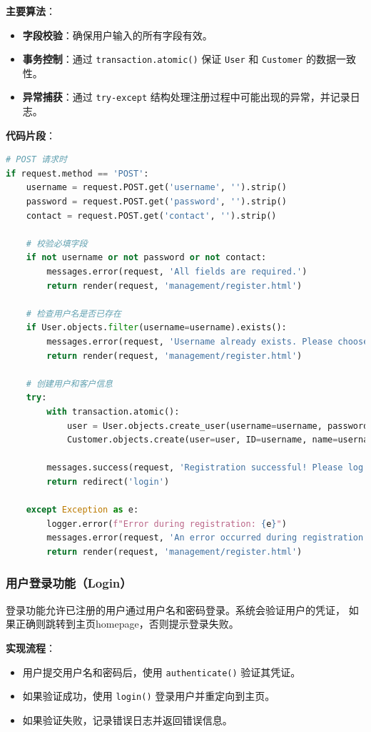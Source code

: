\documentclass[UTF8,a4paper,12pt]{ctexart}
\begin{document}
\textbf{主要算法}：
\begin{itemize}
    \item \textbf{字段校验}：确保用户输入的所有字段有效。
    \item \textbf{事务控制}：通过 \texttt{transaction.atomic()} 保证 \texttt{User} 和 \texttt{Customer} 的数据一致性。
    \item \textbf{异常捕获}：通过 \texttt{try-except} 结构处理注册过程中可能出现的异常，并记录日志。
\end{itemize}

\textbf{代码片段}：
\begin{lstlisting}[language=Python]
# POST 请求时
if request.method == 'POST':
    username = request.POST.get('username', '').strip()
    password = request.POST.get('password', '').strip()
    contact = request.POST.get('contact', '').strip()

    # 校验必填字段
    if not username or not password or not contact:
        messages.error(request, 'All fields are required.')
        return render(request, 'management/register.html')

    # 检查用户名是否已存在
    if User.objects.filter(username=username).exists():
        messages.error(request, 'Username already exists. Please choose another one.')
        return render(request, 'management/register.html')

    # 创建用户和客户信息
    try:
        with transaction.atomic():
            user = User.objects.create_user(username=username, password=password)
            Customer.objects.create(user=user, ID=username, name=username, contact=contact)

        messages.success(request, 'Registration successful! Please log in.')
        return redirect('login')

    except Exception as e:
        logger.error(f"Error during registration: {e}")
        messages.error(request, 'An error occurred during registration. Please try again.')
        return render(request, 'management/register.html')
\end{lstlisting}

\subsubsection{用户登录功能（Login）}
登录功能允许已注册的用户通过用户名和密码登录。系统会验证用户的凭证，
如果正确则跳转到主页homepage，否则提示登录失败。

\textbf{实现流程}：
\begin{itemize}
    \item 用户提交用户名和密码后，使用 \texttt{authenticate()} 验证其凭证。
    \item 如果验证成功，使用 \texttt{login()} 登录用户并重定向到主页。
    \item 如果验证失败，记录错误日志并返回错误信息。
\end{itemize}
\end{document}
